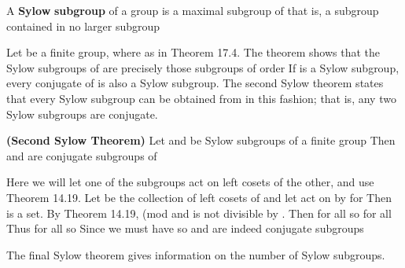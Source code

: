 \documentclass[11pt,oneside]{article}
\begin{document}
\begin{BookBody}
 A\textbf{ Sylow} \textbf{subgroup}  of a group  is a maximal subgroup of  that is, a subgroup contained in no larger subgroup\BookEnd{\blacksquare}

\noindent Let  be a finite group, where  as in Theorem 17.4. The theorem shows that the Sylow subgroups of  are precisely those subgroups of order  If  is a Sylow subgroup, every conjugate  of  is also a Sylow subgroup. The second Sylow theorem states that every Sylow subgroup can be obtained from  in this fashion; that is, any two Sylow subgroups are conjugate.

 \textbf{(Second Sylow Theorem)} Let  and  be Sylow subgroups of a finite group  Then  and  are conjugate subgroups of 

 Here we will let one of the subgroups act on left cosets of the other, and use Theorem 14.19. Let  be the collection of left cosets of  and let  act on  by  for  Then  is a set. By Theorem 14.19,  (mod  and  is not divisible by . Then  for all  so  for all  Thus  for all  so  Since  we must have  so  and  are indeed conjugate subgroups\BookEnd{\blacklozenge}

\noindent The final Sylow theorem gives information on the number of Sylow subgroups.


\end{BookBody}
\end{document}

